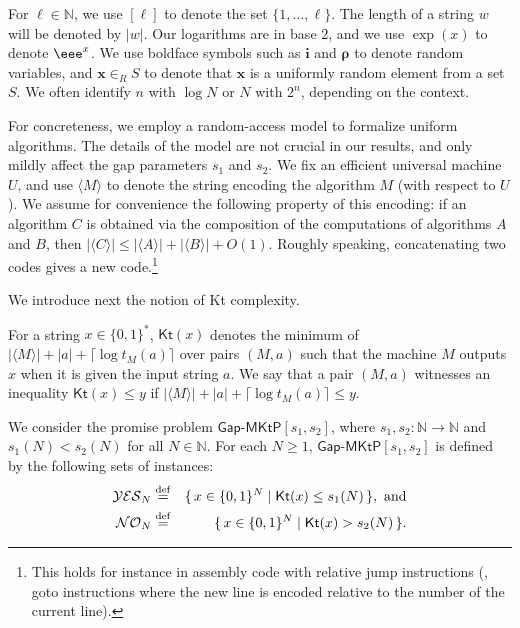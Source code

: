 \documentclass{toc}
\newcommand{\eqdef}{\stackrel{\rm def}{=}}
\newcommand{\gapmktp}{\mathsf{Gap}$-$\mathsf{MKtP}}
\newcommand{\Kt}{\mathsf{Kt}}
\begin{document}
For $\ell \in \mathbb{N}$, we use $[\ell]$ to denote the set $\{1, \ldots, \ell\}$. The length of a string $w$ will be denoted by $|w|$. Our logarithms are in base $2$, and we use $\exp(x)$ to denote $\eee^x$. We use boldface symbols such as ${\bm i}$ and ${\bm \rho}$ to denote random variables, and ${\bm x} \in_R S$ to denote that ${\bm x}$ is a uniformly random element from a set $S$. We often identify $n$ with $\log N$ or $N$ with $2^n$, depending on the context.

\vspace{0.2cm}

For concreteness, we employ a random-access model to formalize uniform algorithms. The details of the model are not crucial in our results, and only mildly affect the gap parameters $s_1$ and $s_2$. We fix an efficient universal machine $U$, and use $\langle M \rangle$ to denote the string encoding the algorithm $M$ (with respect to $U$). We assume for convenience the following property of this encoding: if an algorithm $C$ is obtained via the composition of the computations of algorithms $A$ and $B$, then $| \langle C \rangle | \leq |\langle A \rangle| + |\langle B \rangle| + O(1)$. Roughly speaking, concatenating two codes gives a new code.\footnote{This holds for instance in assembly code with relative jump instructions (\ie, goto instructions where the new line is encoded relative to the number of the current line).}

We introduce next the notion of Kt complexity. 



\begin{definition} \label{d:kt} For a string $x \in \{0,1\}^*$, $\Kt(x)$ denotes the minimum of $|\langle M \rangle| + |a| + \lceil \log t_M(a) \rceil$ over pairs $(M,a)$ such that the machine $M$ outputs $x$ when it is given the input string $a$. We say that a pair $(M,a)$ witnesses an inequality $\Kt(x)\le y$ if $|\langle M \rangle| + |a| + \lceil \log t_M(a) \rceil\le y$.
\end{definition}



\begin{definition} \label{d:gapmktp} We consider the promise problem $\gapmktp[s_1,s_2]$, where $s_1,s_2 \colon \mathbb{N} \to \mathbb{N}$ and $s_1(N) < s_2(N)$ for all $N \in \mathbb{N}$. For each $N \geq 1$, $\gapmktp[s_1,s_2]$ is defined by the following sets of instances:
\begin{eqnarray}
\mathcal{YES}_N & \eqdef & \{\,x \in \{0,1\}^N \mid \Kt(x) \leq s_1(N)\,\},~\text{and} \nonumber \\
\mathcal{NO}_N & \eqdef & \{\,x \in \{0,1\}^N \mid \Kt(x) > s_2(N)\,\}. \nonumber
\end{eqnarray}
\end{definition}
\end{document}
